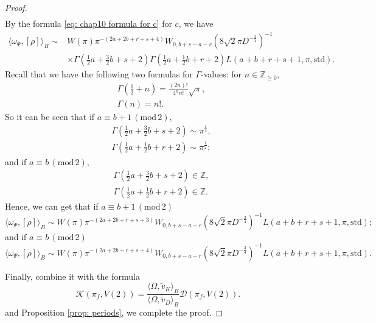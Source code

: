 \documentclass[11pt, a4paper]{amsart}
\theoremstyle{plain}
\theoremstyle{definition}
\numberwithin{equation}{section}
\def\ZZ{\mathbb{Z}}
\begin{document}
\begin{proof}
\begin{align*}
    \end{align*}
    By the formula \ref{eq: chap10 formula for c} for $c$, we have 
    \begin{align*}
         \langle \omega_{\Psi}, [\rho] \rangle_{B}  \sim & W(\pi)  \pi^{-(2a + 2b + r + s + 4)} W_{0, b + s - a - r}(8\sqrt{2}\pi D^{-\frac{3}{4}})^{-1} \\
                        & \times \Gamma( \frac{1}{2}a + \frac{3}{2}b + s + 2) \Gamma(\frac{1}{2}a + \frac{1}{2} b + r + 2) L(a + b + r + s + 1, \pi, \mathrm{std}). 
    \end{align*}
    Recall that we have the following two formulas for $\Gamma$-values: for $n \in \ZZ_{\ge 0}$, 
    \begin{align*}
        & \Gamma(\frac{1}{2} + n) = \frac{(2n)!}{4^{n}n!} \sqrt{\pi}, \\
        & \Gamma(n) = n!. 
    \end{align*}
    So it can be seen that if $a \equiv b + 1\, (\mathrm{mod} \, 2)$,
    \begin{align*}
        &  \Gamma\left( \frac{1}{2}a + \frac{3}{2}b + s + 2\right) \sim \pi^{\frac{1}{2}}, \\ 
        &  \Gamma\left(\frac{1}{2}a + \frac{1}{2} b + r + 2\right) \sim \pi^{\frac{1}{2}}; 
    \end{align*}
    and if $a \equiv b \, (\mathrm{mod} \, 2)$,  
     \begin{align*}
        & \Gamma\left( \frac{1}{2}a + \frac{3}{2}b + s + 2\right)  \in \ZZ,  \\ 
        & \Gamma\left(\frac{1}{2}a + \frac{1}{2} b + r + 2\right)  \in \ZZ.  
    \end{align*}
    Hence, we can get that if $a \equiv b + 1\, (\mathrm{mod} \, 2)$
    \begin{equation*}
         \langle \omega_{\Psi}, [\rho] \rangle_{B}    \sim W(\pi)  \pi^{-(2a + 2b + r + s + 3)} W_{0, b + s - a - r}(8\sqrt{2}\pi D^{-\frac{3}{4}})^{-1} L(a + b + r + s + 1, \pi, \mathrm{std});
    \end{equation*}
    and if 
    $a \equiv b \, (\mathrm{mod} \, 2)$
    \begin{equation*}
         \langle \omega_{\Psi}, [\rho] \rangle_{B}    \sim W(\pi)  \pi^{-(2a + 2b + r + s + 4)} W_{0, b + s - a - r}(8\sqrt{2}\pi D^{-\frac{3}{4}})^{-1} L(a + b + r + s + 1, \pi, \mathrm{std}). 
    \end{equation*}
    \par Finally, combine it with the formula 
    \begin{equation*}
        \mathcal{K}(\pi_{f}, V(2)) = \frac{\langle \Omega, \tilde{v}_{K} \rangle_{B}}{\langle \Omega, \tilde{v}_{D} \rangle_{B}} \mathcal{D}(\pi_f, V(2)). 
    \end{equation*}
    and Proposition \ref{prop: periods}, 
    we complete the proof. 
\end{proof}
\end{document}
